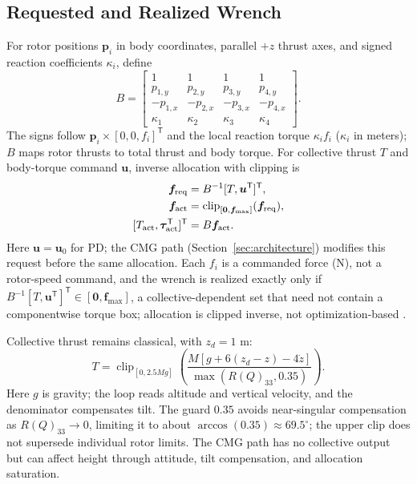 \documentclass[letterpaper, 10 pt, conference]{ieeeconf}
\newcommand{\T}{^{\mathsf T}}
\newcommand{\clip}{\operatorname{clip}}
\begin{document}
\subsection{Requested and Realized Wrench}
For rotor positions $\bm p_i$ in body coordinates, parallel $+z$ thrust
axes, and signed reaction coefficients $\kappa_i$, define
\begin{equation}
 B=\begin{bmatrix}
 1&1&1&1\\p_{1,y}&p_{2,y}&p_{3,y}&p_{4,y}\\
 -p_{1,x}&-p_{2,x}&-p_{3,x}&-p_{4,x}\\
 \kappa_1&\kappa_2&\kappa_3&\kappa_4
 \end{bmatrix}.
 \label{eq:allocationmatrix}
\end{equation}
The signs follow $\bm p_i\times[0,0,f_i]\T$ and the local reaction torque $\kappa_i f_i$ ($\kappa_i$ in meters); $B$ maps rotor thrusts to total thrust and body torque. For collective thrust $T$ and body-torque command $\bm u$, inverse allocation with clipping is
\begin{equation}
 \begin{aligned}
 \bm f_{\rm req}&=B^{-1}[T,\bm u\T]\T,\\
 \bm f_{\rm act}&=\clip_{[\bm0,\bm f_{\max}]}(\bm f_{\rm req}),\\
 [T_{\rm act},\bm\tau_{\rm act}\T]\T&=B\bm f_{\rm act}.
 \end{aligned}
 \label{eq:mixer}
\end{equation}
Here $\bm u=\bm u_0$ for PD; the CMG path (Section~\ref{sec:architecture})
modifies this request before the same allocation. Each $f_i$ is a commanded
force (N), not a rotor-speed command, and the wrench is realized exactly
only if $B^{-1}[T,\bm u\T]\T\in[\bm0,\bm f_{\max}]$, a
collective-dependent set that need not contain a componentwise torque box;
allocation is clipped inverse, not optimization-based
\cite{monteiro2016allocation}.

Collective thrust remains classical, with $z_d=1$ m:
\begin{equation}
 T=\clip_{[0,2.5Mg]}
 \left(\frac{M[g+6(z_d-z)-4\dot z]}{\max(R(Q)_{33},0.35)}\right).
 \label{eq:collective}
\end{equation}
Here $g$ is gravity; the loop reads altitude and vertical velocity, and the
denominator compensates tilt. The guard $0.35$ avoids near-singular
compensation as $R(Q)_{33}\to0$, limiting it to about
$\arccos(0.35)\approx69.5^\circ$; the upper clip does not supersede
individual rotor limits. The CMG path has no collective output but can
affect height through attitude, tilt compensation, and allocation
saturation.
\end{document}
